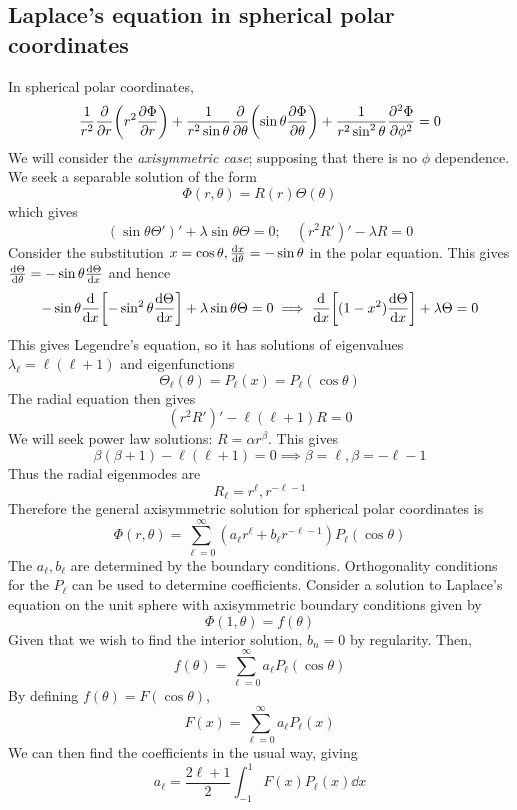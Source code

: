 \subsection{Laplace's equation in spherical polar coordinates}
In spherical polar coordinates,
\[
	\frac{1}{r^2} \pdv{r} \qty(r^2 \pdv{\Phi}{r}) + \frac{1}{r^2 \sin\theta}\pdv{\theta} \qty(\sin\theta \pdv{\Phi}{\theta}) + \frac{1}{r^2 \sin^2 \theta} \pdv[2]{\Phi}{\phi} = 0
\]
We will consider the \textit{axisymmetric case}; supposing that there is no \( \phi \) dependence.
We seek a separable solution of the form
\[
	\Phi(r,\theta) = R(r) \Theta(\theta)
\]
which gives
\[
	(\sin\theta \Theta')' + \lambda \sin\theta \Theta = 0;\quad (r^2R')' - \lambda R = 0
\]
Consider the substitution \( x = \cos\theta, \dv{x}{\theta} = -\sin\theta \) in the polar equation.
This gives \( \dv{\Theta}{\theta} = -\sin\theta \dv{\Theta}{x} \) and hence
\[
	-\sin\theta \dv{x}\qty[-\sin^2\theta \dv{\Theta}{x}] + \lambda \sin\theta \Theta = 0 \implies \dv{x}\qty[(1-x^2)\dv{\Theta}{x}] + \lambda \Theta = 0
\]
This gives Legendre's equation, so it has solutions of eigenvalues \( \lambda_\ell = \ell (\ell + 1) \) and eigenfunctions
\[
	\Theta_\ell(\theta) = P_\ell(x) = P_\ell(\cos\theta)
\]
The radial equation then gives
\[
	(r^2 R')' - \ell (\ell + 1) R = 0
\]
We will seek power law solutions: \( R = \alpha r^\beta \).
This gives
\[
	\beta(\beta + 1) - \ell(\ell + 1) = 0 \implies \beta = \ell, \beta = -\ell - 1
\]
Thus the radial eigenmodes are
\[
	R_\ell = r^{\ell}, r^{-\ell - 1}
\]
Therefore the general axisymmetric solution for spherical polar coordinates is
\[
	\Phi(r,\theta) = \sum_{\ell = 0}^\infty (a_\ell r^{\ell} + b_\ell r^{-\ell - 1}) P_\ell(\cos\theta)
\]
The \( a_\ell, b_\ell \) are determined by the boundary conditions.
Orthogonality conditions for the \( P_\ell \) can be used to determine coefficients.
Consider a solution to Laplace's equation on the unit sphere with axisymmetric boundary conditions given by
\[
	\Phi(1,\theta) = f(\theta)
\]
Given that we wish to find the interior solution, \( b_n = 0 \) by regularity.
Then,
\[
	f(\theta) = \sum_{\ell=0}^\infty a_\ell P_\ell(\cos\theta)
\]
By defining \( f(\theta) = F(\cos\theta) \),
\[
	F(x) = \sum_{\ell=0}^\infty a_\ell P_\ell(x)
\]
We can then find the coefficients in the usual way, giving
\[
	a_\ell = \frac{2\ell + 1}{2} \int_{-1}^1 F(x) P_{\ell}(x) \dd{x}
\]

